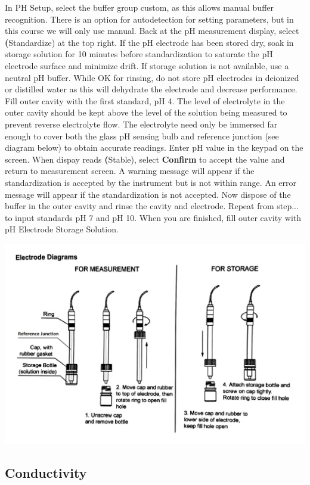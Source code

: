 \documentclass[12pt]{../SOP3_beta}\usepackage[]{graphicx}\usepackage[]{color}
\begin{document}
\NP In PH Setup, select the buffer group custom, as this allows manual buffer recognition. There is an option for autodetection for setting parameters, but in this course we will only use manual.
\NP Back at the pH measurement display, select \textbf(Standardize) at the top right.
\NP If the pH electrode has been stored dry, soak in storage solution for 10 minutes before standardization to saturate the pH electrode surface and minimize drift. If storage solution is not available, use a neutral pH buffer. While OK for rinsing, do not store pH electrodes in deionized or distilled water as this will dehydrate the electrode and decrease performance. 
\NP Fill outer cavity with the first standard, pH 4. The level of electrolyte in the outer cavity should be kept above the level of the solution being measured to prevent reverse electrolyte flow. The electrolyte need only be immersed far enough to cover both the glass pH sensing bulb and reference junction (see diagram below) to obtain accurate readings.
\NP Enter pH value in the keypad on the screen.
\NP When dispay reads \textbf(Stable), select \textbf{Confirm} to accept the value and return to measurement screen. A warning message will appear if the standardization is accepted by the instrument but is not within range. An error message will appear if the standardization is not accepted.
\NP Now dispose of the buffer in the outer cavity and rinse the cavity and electrode. Repeat from step... to input standards pH 7 and pH 10.
\NP When you are finished, fill outer cavity with pH Electrode Storage Solution.

\NP\includegraphics[scale=.25]{Electrode.jpg}

\subsection{Conductivity}
\end{document}

